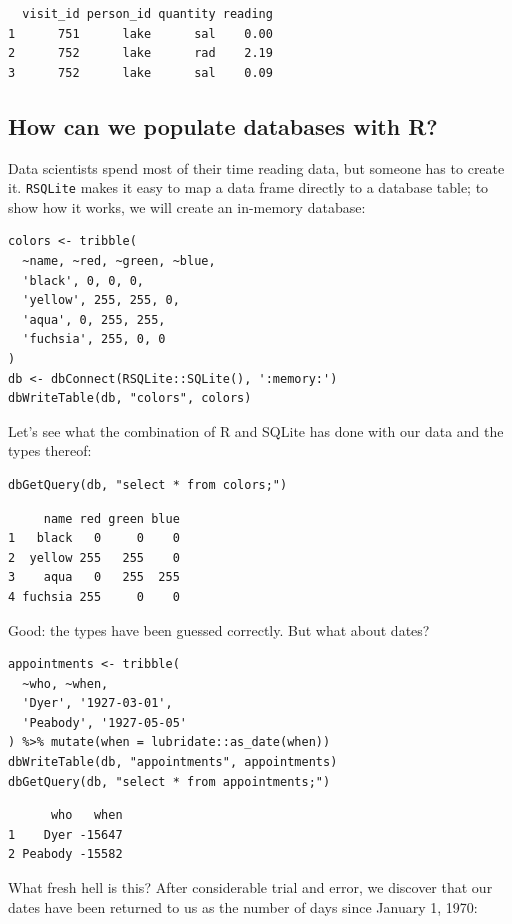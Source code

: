 \begin{lstlisting}
  visit_id person_id quantity reading
1      751      lake      sal    0.00
2      752      lake      rad    2.19
3      752      lake      sal    0.09
\end{lstlisting}

\subsection*{How can we populate databases with R?}

Data scientists spend most of their time reading data,
but someone has to create it.
\texttt{RSQLite} makes it easy to map a data frame directly to a database table;
to show how it works,
we will create an in-memory database:

\begin{lstlisting}
colors <- tribble(
  ~name, ~red, ~green, ~blue,
  'black', 0, 0, 0,
  'yellow', 255, 255, 0,
  'aqua', 0, 255, 255,
  'fuchsia', 255, 0, 0
)
db <- dbConnect(RSQLite::SQLite(), ':memory:')
dbWriteTable(db, "colors", colors)
\end{lstlisting}

Let's see what the combination of R and SQLite has done with our data and the types thereof:

\begin{lstlisting}
dbGetQuery(db, "select * from colors;")
\end{lstlisting}

\begin{lstlisting}
     name red green blue
1   black   0     0    0
2  yellow 255   255    0
3    aqua   0   255  255
4 fuchsia 255     0    0
\end{lstlisting}

Good: the types have been guessed correctly.
But what about dates?

\begin{lstlisting}
appointments <- tribble(
  ~who, ~when,
  'Dyer', '1927-03-01',
  'Peabody', '1927-05-05'
) %>% mutate(when = lubridate::as_date(when))
dbWriteTable(db, "appointments", appointments)
dbGetQuery(db, "select * from appointments;")
\end{lstlisting}

\begin{lstlisting}
      who   when
1    Dyer -15647
2 Peabody -15582
\end{lstlisting}

What fresh hell is this?
After considerable trial and error,
we discover that our dates have been returned to us as
the number of days since January 1, 1970:

